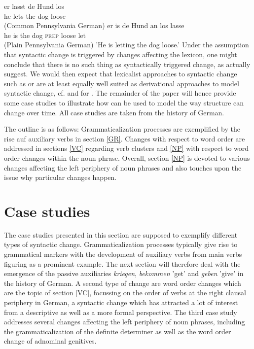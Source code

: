 \documentclass[output=paper]{langsci/langscibook}
\begin{document}
\eal
\ex
\gll er lasst de Hund los \\ he lets the dog loose \\  \hfill (Common Pennsylvania German)
\ex
\gll er is de Hund an los lasse \\ he is the dog \textsc{prep} loose let \\  \hfill (Plain Pennsylvania German)
\glt 'He is letting the dog loose.'
\zl
Under the assumption that syntactic change is triggered by changes affecting the lexicon, one might conclude that there is no such thing as syntactically triggered change, as \cite{BiWa2015} actually suggest. We would then expect that lexicalist approaches to syntactic change such as \hpsg or \lfg are at least equally well suited as derivational approaches to model syntactic change, cf. \cite{vincent2001} and \cite{BoVi2017} for \lfg. The remainder of the paper will hence provide some case studies to illustrate how \hpsg can be used to model the way structure can change over time. All case studies are taken from the history of German.
 
The outline is as follows: Grammaticalization processes are exemplified by the rise auf auxiliary verbs in section \ref{GR}. Changes with respect to word order are addressed in sections \ref{VC} regarding verb clusters and \ref{NP} with respect to word order changes within the noun phrase. Overall, section \ref{NP} is devoted to various changes affecting the left periphery of noun phrases and also touches upon the issue why particular changes happen.  

\section{Case studies}

The case studies presented in this section are supposed to exemplify different types of syntactic change. Grammaticalization processes typically give rise to grammatical markers with the development of auxiliary verbs from main verbs figuring as a prominent example. The next section will therefore deal with the emergence of the passive auxiliaries \emph{kriegen}, \emph{bekommen} 'get' and \textit{geben} 'give' in the history of German. A second type of change are word order changes which are the topic of section \ref{VC}, focussing on the order of verbs at the right clausal periphery in German, a syntactic change which has attracted a lot of interest from a descriptive as well as a more formal perspective. The third case study addresses several changes affecting the left periphery of noun phrases, including the grammaticalization of the definite determiner as well as the word order change of adnominal genitives. 
\end{document}
